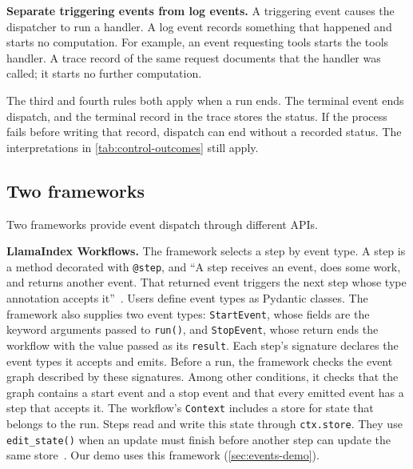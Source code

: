 \item \textbf{Separate triggering events from log events.} A triggering event causes the
dispatcher to run a handler. A log event records something that happened and starts no
computation. For example, an event requesting tools starts the tools handler. A trace record of
the same request documents that the handler was called; it starts no further computation.

\ei

The third and fourth rules both apply when a run ends. The terminal event ends dispatch, and the
terminal record in the trace stores the status. If the process fails before writing that record,
dispatch can end without a recorded status. The interpretations in \cref{tab:control-outcomes}
still apply.

\subsection{Two frameworks}
\label{sec:events-frameworks}

Two frameworks provide event dispatch through different APIs.

\bi

\item \textbf{LlamaIndex Workflows.} The framework selects a step by event type. A step is a method decorated with
\texttt{@step}, and ``A step receives an event, does some work, and returns another event. That
returned event triggers the next step whose type annotation accepts it''~\citep{llamaindex-workflows}.
Users define event types as Pydantic classes. The framework also supplies two event types:
\texttt{StartEvent}, whose fields are the keyword arguments passed to \texttt{run()}, and
\texttt{StopEvent}, whose return ends the workflow with the value passed as its \texttt{result}.
Each step's signature declares the event types it accepts and emits. Before a run, the framework
checks the event graph described by these signatures. Among other conditions, it checks that the
graph contains a start event and a stop event and that every emitted event has a step that accepts
it. The workflow's \texttt{Context} includes a store for state that belongs to the run. Steps
read and write this state through \texttt{ctx.store}. They use \texttt{edit\_state()} when an
update must finish before another step can update the same store~\citep{llamaindex-workflows-state}.
Our demo uses this framework (\cref{sec:events-demo}).

